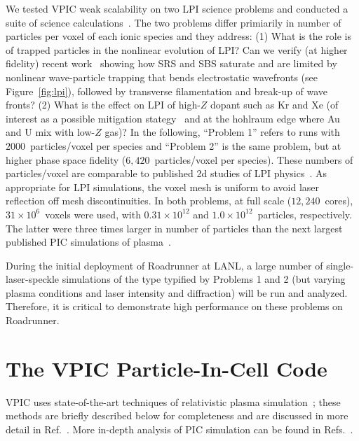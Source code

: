 \documentclass[journal,twoside]{IEEEtran}
\newcommand{\fig}[1]{Figure~\ref{fig:#1}}
\begin{document}
We tested VPIC weak scalability on two LPI science problems and
conducted a suite of science calculations~\cite{AAC_Conference_Paper}.
The two problems differ primiarily in number of particles per voxel of
each ionic species and they address: (1) What is the role is of
trapped particles in the nonlinear evolution of LPI?  Can we verify
(at higher fidelity) recent
work~\cite{Yin_et_al_PRL_2007_SRS,Yin_et_al_Phys_Plasmas_2007_SRS}
showing how SRS and SBS saturate and are limited by nonlinear
wave-particle trapping that bends electrostatic wavefronts (see
\fig{lpi}), followed by transverse filamentation and break-up
of wave fronts?  (2) What is the effect on LPI of high-$Z$ dopant such
as Kr and Xe (of interest as a possible mitigation
stategy~\cite{Lushnikov_PPCF_2006} and at the hohlraum edge where Au
and U mix with low-$Z$ gas)?  In the following, ``Problem 1'' refers
to runs with $2000$~particles/voxel per species and ``Problem 2'' is
the same problem, but at higher phase space fidelity
($6,420$~particles/voxel per species).  These numbers of
particles/voxel are comparable to published 2d studies of LPI
physics~\cite{Yin_et_al_PRL_2007_SRS,Yin_et_al_Phys_Plasmas_2007_SRS}. 
As appropriate for LPI simulations, the voxel mesh is uniform to avoid
laser reflection off mesh discontinuities.  In both problems, at full
scale ($12,240$~cores), $31 \times 10^6$~voxels were used, with $0.31
\times 10^{12}$ and $1.0 \times 10^{12}$~particles, respectively.  The
latter were three times larger in number of particles than the next 
largest published PIC simulations of 
plasma~\cite{Yin_et_al_PRL_2007_reconnection}.

During the initial deployment of Roadrunner at LANL, a large number of
single-laser-speckle simulations of the type typified by Problems 
1 and 2 (but varying plasma conditions and laser intensity and 
diffraction) will be run and analyzed.  Therefore, it is critical to 
demonstrate high performance on these problems on Roadrunner. 

\section{The VPIC Particle-In-Cell Code}

VPIC uses state-of-the-art techniques of relativistic plasma
simulation~\cite{Blahovec_et_al_2000,Eastwood_et_al_1995,
Jones_et_al_1996,Kwan_Snell_1985,Nieter_Cary_2004,
Verboncoeur_et_al_1995}; these methods are briefly described below for
completeness and are discussed in more detail in
Ref.~\cite{Bowers_et_al_Phys_Plasmas_2007}.  More in-depth analysis of
PIC simulation can be found in
Refs.~\cite{Birdsall_Langdon_1985,Hockney_Eastwood_1988}.
\end{document}
